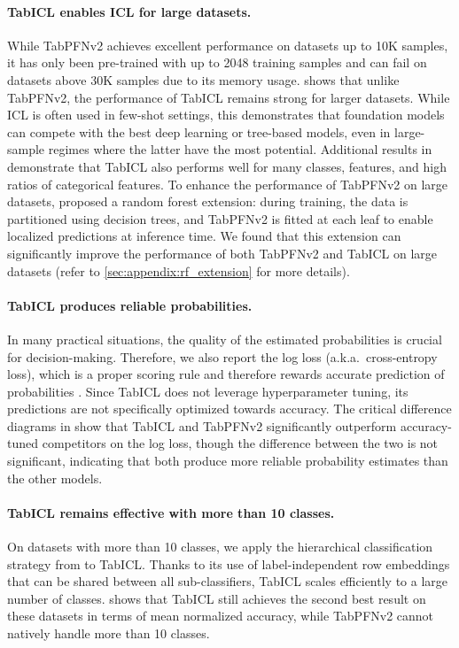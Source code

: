 \documentclass{article}
\theoremstyle{plain}
\theoremstyle{definition}
\theoremstyle{remark}
\begin{document}
\paragraph{TabICL enables ICL for large datasets.} While TabPFNv2 achieves excellent performance on datasets up to 10K samples, it has only been pre-trained with up to 2048 training samples and can fail on datasets above 30K samples due to its memory usage.  shows that unlike TabPFNv2, the performance of TabICL remains strong for larger datasets. While ICL is often used in few-shot settings, this demonstrates that foundation models can compete with the best deep learning or tree-based models, even in large-sample regimes where the latter have the most potential.
Additional results in  demonstrate that TabICL also performs well for many classes, features, and high ratios of categorical features.
To enhance the performance of TabPFNv2 on large datasets,
\citet{hollmannAccuratePredictionsSmall2025} proposed a random forest extension: during training, the data is partitioned using decision trees, and TabPFNv2 is fitted at each leaf to enable localized predictions at inference time. We found that this extension can significantly improve the performance of both TabPFNv2 and TabICL on large datasets (refer to \cref{sec:appendix:rf_extension} for more details).

\paragraph{TabICL produces reliable probabilities.} In many practical situations, the quality of the estimated probabilities is crucial for decision-making. Therefore, we also report the log loss (a.k.a.\ cross-entropy loss), which is a proper scoring rule and therefore rewards accurate prediction of probabilities \citep{gneiting2007strictly}. Since TabICL does not leverage hyperparameter tuning, its predictions are not specifically optimized towards accuracy. The critical difference diagrams in  show that TabICL and TabPFNv2 significantly outperform accuracy-tuned competitors on the log loss, though the difference between the two is not significant, indicating that both produce more reliable probability estimates than the other models.

\paragraph{TabICL remains effective with more than 10 classes.} On datasets with more than 10 classes, we apply the hierarchical classification strategy from  to TabICL. Thanks to its use of label-independent row embeddings that can be shared between all sub-classifiers, TabICL scales efficiently to a large number of classes.  shows that TabICL still achieves the second best result on these datasets in terms of mean normalized accuracy, while TabPFNv2 cannot natively handle more than 10 classes.
\end{document}
